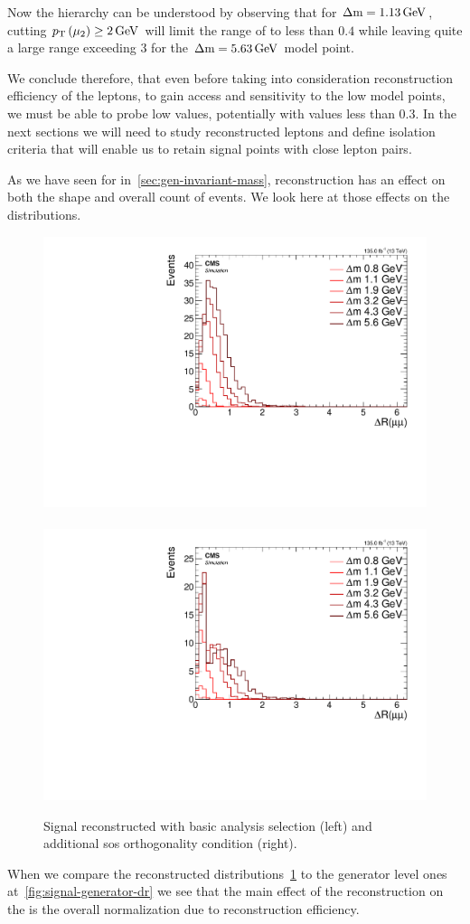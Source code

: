 Now the hierarchy can be understood by observing that for $\Delta\mathrm{m}=1.13\,\text{Ge\hspace{-.08em}V}$, cutting $p_{\mathrm{T}}\left(\mu_2\right)\geq 2\,\text{Ge\hspace{-.08em}V}$ will limit the range of \drmm to less than $0.4$ while leaving quite a large range exceeding 3 for the $\Delta\mathrm{m}=5.63\,\text{Ge\hspace{-.08em}V}$ model point.

We conclude therefore, that even before taking into consideration reconstruction efficiency of the leptons, to gain access and sensitivity to the low \dm model points, we must be able to probe low \drll values, potentially with values less than 0.3. In the next sections we will need to study reconstructed leptons and define isolation criteria that will enable us to retain signal points with close lepton pairs.

As we have seen for \mmumu in~\ref{sec:gen-invariant-mass}, reconstruction has an effect on both the shape and overall count of events. We look here at those effects on the \drmm distributions.

\begin{figure}[!htb]
\centering
\includegraphics[width=0.48\linewidth]{plots/signal_muons/none_deltaRCorrJetNoMultIso10Dr0.6.pdf} \,
\includegraphics[width=0.48\linewidth]{plots/signal_muons/none_deltaRCorrJetNoMultIso10Dr0.6_orth.pdf}  \\
\caption[Signal reconstructed \drmm]{ Signal reconstructed \drmm with basic analysis selection (left) and additional \gls{sos} orthogonality condition (right).}
\label{fig:reco-signal-dr}
\end{figure}

When we compare the reconstructed \drmm distributions~\ref{fig:reco-signal-dr} to the generator level ones at~\ref{fig:signal-generator-dr} we see that the main effect of the reconstruction on the \drmm is the overall normalization due to reconstruction efficiency.

